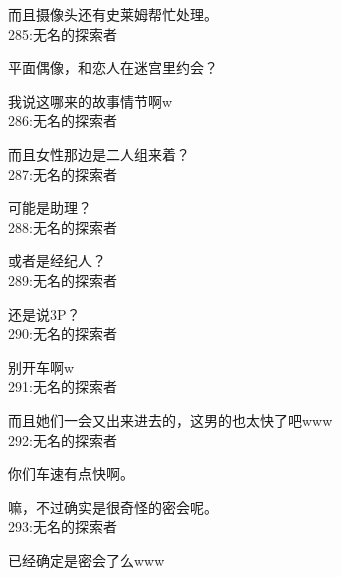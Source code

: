而且摄像头还有史莱姆帮忙处理。\\

285:无名的探索者

平面偶像，和恋人在迷宫里约会？

我说这哪来的故事情节啊w\\

286:无名的探索者

而且女性那边是二人组来着？\\

287:无名的探索者

可能是助理？\\

288:无名的探索者

或者是经纪人？\\

289:无名的探索者

还是说3P？\\

290:无名的探索者

别开车啊w\\

291:无名的探索者

而且她们一会又出来进去的，这男的也太快了吧www\\

292:无名的探索者

你们车速有点快啊。

嘛，不过确实是很奇怪的密会呢。\\

293:无名的探索者

已经确定是密会了么www\\

